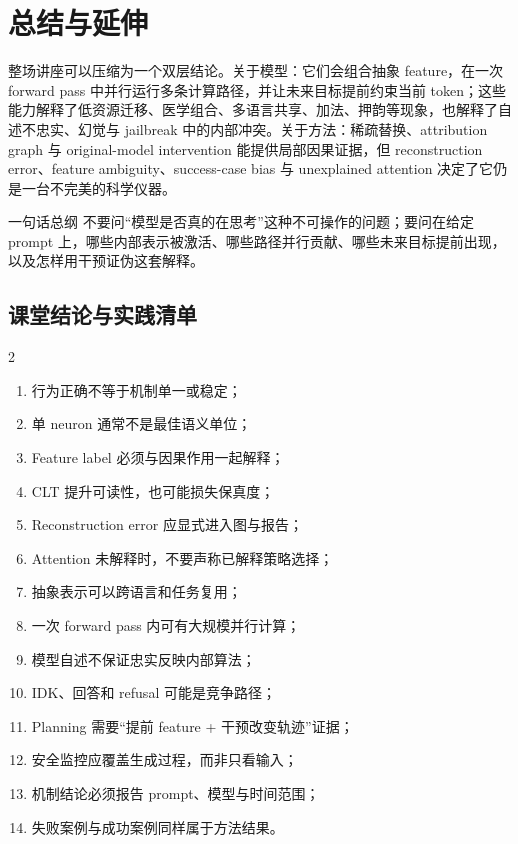 \section{总结与延伸}

整场讲座可以压缩为一个双层结论。关于模型：它们会组合抽象 feature，在一次 forward pass 中并行运行多条计算路径，并让未来目标提前约束当前 token；这些能力解释了低资源迁移、医学组合、多语言共享、加法、押韵等现象，也解释了自述不忠实、幻觉与 jailbreak 中的内部冲突。关于方法：稀疏替换、attribution graph 与 original-model intervention 能提供局部因果证据，但 reconstruction error、feature ambiguity、success-case bias 与 unexplained attention 决定了它仍是一台不完美的科学仪器。

\begin{importantbox}{一句话总纲}
不要问“模型是否真的在思考”这种不可操作的问题；要问在给定 prompt 上，哪些内部表示被激活、哪些路径并行贡献、哪些未来目标提前出现，以及怎样用干预证伪这套解释。
\end{importantbox}

\subsection{课堂结论与实践清单}

\small
\begin{multicols}{2}
\begin{enumerate}
  \item 行为正确不等于机制单一或稳定；
  \item 单 neuron 通常不是最佳语义单位；
  \item Feature label 必须与因果作用一起解释；
  \item CLT 提升可读性，也可能损失保真度；
  \item Reconstruction error 应显式进入图与报告；
  \item Attention 未解释时，不要声称已解释策略选择；
  \item 抽象表示可以跨语言和任务复用；
  \item 一次 forward pass 内可有大规模并行计算；
  \item 模型自述不保证忠实反映内部算法；
  \item IDK、回答和 refusal 可能是竞争路径；
  \item Planning 需要“提前 feature + 干预改变轨迹”证据；
  \item 安全监控应覆盖生成过程，而非只看输入；
  \item 机制结论必须报告 prompt、模型与时间范围；
  \item 失败案例与成功案例同样属于方法结果。
\end{enumerate}
\end{multicols}
\normalsize

